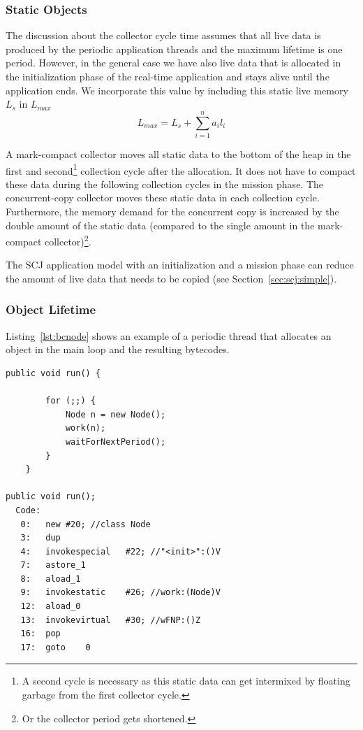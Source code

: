 \subsubsection{Static Objects}

The discussion about the collector cycle time assumes that all live
data is produced by the periodic application threads and the maximum
lifetime is one period. However, in the general case we have also
live data that is allocated in the initialization phase of the
real-time application and stays alive until the application ends. We
incorporate this value by including this static live memory $L_s$ in
$L_{max}$
\begin{equation}
    L_{max} = L_s + \sum_{i=1}^{n} a_i l_i
\end{equation}


A mark-compact collector moves all static data to the bottom of the
heap in the first and second\footnote{A second cycle is necessary as
this static data can get intermixed by floating garbage from the
first collector cycle.} collection cycle after the allocation. It
does not have to compact these data during the following collection
cycles in the mission phase. The concurrent-copy collector moves
these static data in each collection cycle. Furthermore, the memory
demand for the concurrent copy is increased by the double amount of
the static data (compared to the single amount in the mark-compact
collector)\footnote{Or the collector period gets shortened.}.

The SCJ application model with an initialization and a mission phase
can reduce the amount of live data that needs to be copied (see
Section~\ref{sec:scj:simple}).


\subsubsection{Object Lifetime} \label{sec:wc:live}

Listing~\ref{lst:bcnode} shows an example of a periodic thread that
allocates an object in the main loop and the resulting bytecodes.

\begin{lstlisting}[float, caption={Example periodic thread and the corresponding Java bytecodes},
label=lst:bcnode]
    public void run() {

        for (;;) {
            Node n = new Node();
            work(n);
            waitForNextPeriod();
        }
    }

public void run();
  Code:
   0:   new #20; //class Node
   3:   dup
   4:   invokespecial   #22; //"<init>":()V
   7:   astore_1
   8:   aload_1
   9:   invokestatic    #26; //work:(Node)V
   12:  aload_0
   13:  invokevirtual   #30; //wFNP:()Z
   16:  pop
   17:  goto    0
\end{lstlisting}


